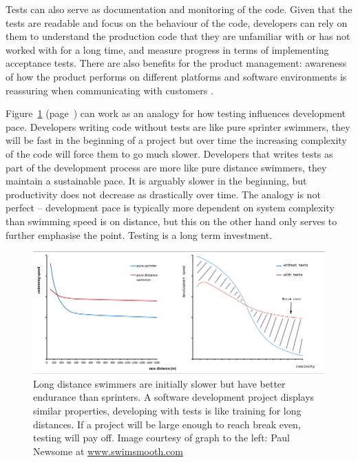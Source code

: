\documentclass[11pt]{article}
\begin{document}
Tests can also serve as documentation and monitoring of the code. Given that the tests are readable and focus on the behaviour of the code, developers can rely on them to understand the production code that they are unfamiliar with or has not worked with for a long time, and measure progress in terms of implementing acceptance tests. There are also benefits for the product management: awareness of how the product performs on different platforms and software environments is reassuring when communicating with customers \cite[question~38]{Ahnve}.

Figure~\ref{fig:distance} (page~\pageref{fig:distance}) can work as an analogy for how testing influences development pace. Developers writing code without tests are like pure sprinter swimmers, they will be fast in the beginning of a project but over time the increasing complexity of the code will force them to go much slower. Developers that writes tests as part of the development process are more like pure distance swimmers, they maintain a sustainable pace. It is arguably slower in the beginning, but productivity does not decrease as drastically over time. The analogy is not perfect -- development pace is typically more dependent on system complexity than swimming speed is on distance, but this on the other hand only serves to further emphasise the point. Testing is a long term investment.

\begin{figure}[ht]
\centering
\includegraphics[width=\textwidth]{pics/distance.png}
\caption{Long distance swimmers are initially slower but have better endurance than sprinters.
A software development project displays similar properties, developing with tests is like training for long distances.
If a project will be large enough to reach break even, testing will pay off.
Image courtesy of graph to the left: Paul Newsome at \small \url{www.swimsmooth.com}}
\label{fig:distance}
\end{figure}
\end{document}
